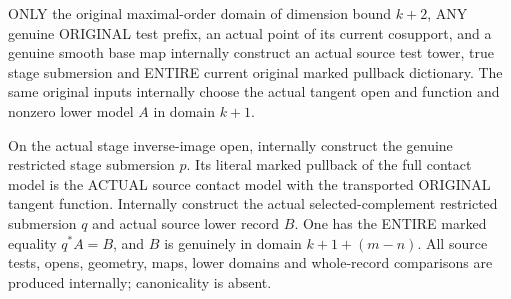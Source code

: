 \begin{theorem}
\label{hir:original-noncanonical-actual-smooth-lower-diagram}
\leanok
ONLY the original maximal-order domain of dimension bound $k+2$, ANY genuine
ORIGINAL test prefix, an actual point of its current cosupport, and a genuine
smooth base map internally construct an actual source test tower, true stage
submersion and ENTIRE current original marked pullback dictionary. The same
original inputs internally choose the actual tangent open and function and
nonzero lower model $A$ in domain $k+1$.

On the actual stage inverse-image open, internally construct the genuine
restricted stage submersion $p$. Its literal marked pullback of the full
contact model is the ACTUAL source contact model with the transported
ORIGINAL tangent function. Internally construct the actual selected-complement
restricted submersion $q$ and actual source lower record $B$. One has the
ENTIRE marked equality $q^*A=B$, and $B$ is genuinely in domain
$k+1+(m-n)$. All source tests, opens, geometry, maps, lower domains and
whole-record comparisons are produced internally; canonicality is absent.
\end{theorem}
